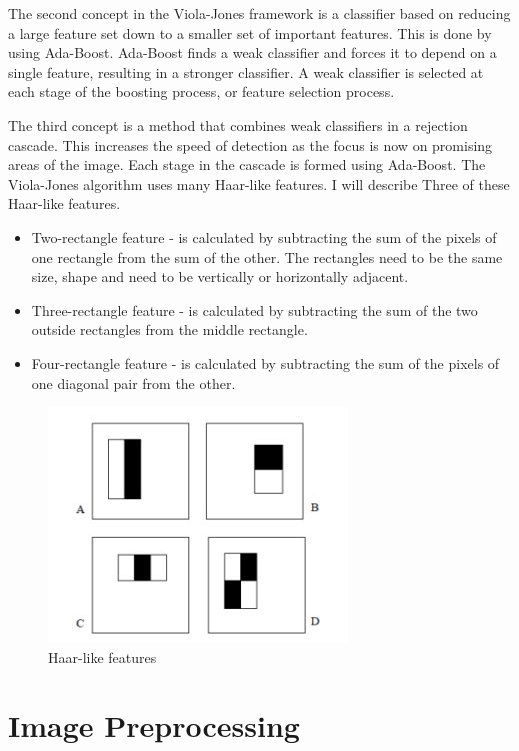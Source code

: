 \begin{flushleft}
The second concept in the Viola-Jones framework\citep{viola} is a classifier based on reducing a large feature set down to a smaller set of important features. This is done by using Ada-Boost. Ada-Boost finds a weak classifier and forces it to depend on a single feature, resulting in a stronger classifier. A weak classifier is selected at each stage of the boosting process, or feature selection process.

The third concept is a method that combines weak classifiers in a rejection cascade. This increases the speed of detection as the focus is now on promising areas of the image. Each stage in the cascade is formed using Ada-Boost. The Viola-Jones algorithm uses many Haar-like features. I will describe Three of these Haar-like features.
\begin{itemize}
  \item Two-rectangle feature - is calculated by subtracting the sum of the pixels of one rectangle from the sum of the other. The rectangles need to be the same size, shape and need to be vertically or horizontally adjacent.
  \item Three-rectangle feature - is calculated by subtracting the sum of the two outside rectangles from the middle rectangle.
  \item Four-rectangle feature - is calculated by subtracting the sum of the pixels of one diagonal pair from the other.
\end{itemize} 
\end{flushleft}
\begin{figure}[H]
  \centering
  \includegraphics[scale=0.8]{2}
  \caption{Haar-like features\citep{viola}}
\end{figure}

\section{Image Preprocessing}
